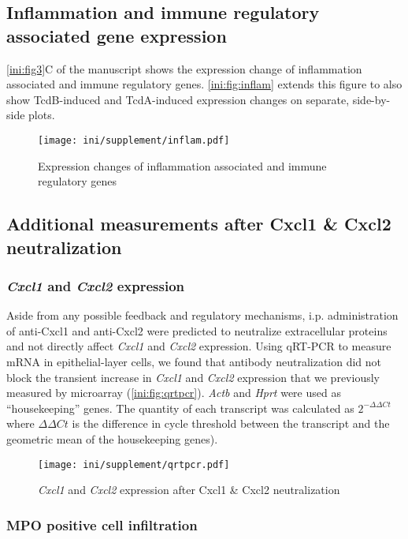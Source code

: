 \subsection{Inflammation and immune regulatory associated gene expression}

\autoref{ini:fig3}C of the manuscript shows the expression change of inflammation associated
and immune regulatory genes. \autoref{ini:fig:inflam} extends this figure to also
show TcdB-induced and TcdA-induced expression changes on separate, side-by-side
plots.

\begin{figure}[h!]
  \centering
    \texttt{[image: ini/supplement/inflam.pdf]}
  \caption{Expression changes of inflammation associated
           and immune regulatory genes}
  \label{ini:fig:inflam}
\end{figure}


\subsection{Additional measurements after Cxcl1 \& Cxcl2 neutralization}

\subsubsection{\emph{Cxcl1} and \emph{Cxcl2} expression}

Aside from any possible feedback and regulatory mechanisms, i\@.p\@. administration of anti-Cxcl1 and
anti-Cxcl2 were predicted to neutralize extracellular proteins and not directly affect 
\emph{Cxcl1} and \emph{Cxcl2} expression. Using qRT-PCR to measure mRNA
in epithelial-layer cells, we found that antibody neutralization did not block the transient
increase in \emph{Cxcl1} and \emph{Cxcl2} expression that we previously 
measured by microarray (\autoref{ini:fig:qrtpcr}). \emph{Actb} and \emph{Hprt}
were used as ``housekeeping'' genes.
The quantity of each transcript was calculated as $2^{-\Delta \Delta Ct}$ where
$\Delta \Delta Ct$ is the difference in cycle threshold between the transcript and the 
geometric mean of the housekeeping genes).

\begin{figure}[ht]
\centering
\texttt{[image: ini/supplement/qrtpcr.pdf]}
\caption{ \emph{Cxcl1} and \emph{Cxcl2} expression after Cxcl1 \& Cxcl2 neutralization }
\label{ini:fig:qrtpcr}
\end{figure}


\subsubsection{MPO positive cell infiltration}


